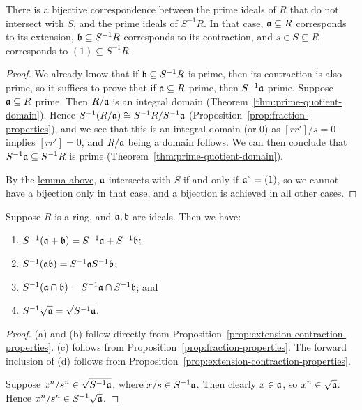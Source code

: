 \begin{theorem}\label{thm:fraction-correspondence}
    There is a bijective correspondence between 
    the prime ideals of \(R\) that do not intersect with \(S\),
    and the prime ideals of \(S^{-1}R\).
    In that case, \(\mathfrak{a} \subseteq R\) corresponds to its extension,
    \(\mathfrak{b} \subseteq S^{-1}R\) corresponds to its contraction,
    and \(s \in S \subseteq R\) corresponds to \((1) \subseteq S^{-1}R\).
\end{theorem}
\begin{proof}
    We already know that if \(\mathfrak{b} \subseteq S^{-1}R\) is prime,
    then its contraction is also prime,
    so it suffices to prove that if \(\mathfrak{a} \subseteq R\) prime, then \(S^{-1}\mathfrak{a}\) prime.
    Suppose \(\mathfrak{a} \subseteq R\) prime.
    Then \(R/\mathfrak{a}\) is an integral domain (Theorem~\ref{thm:prime-quotient-domain}).
    Hence \(S^{-1}(R/\mathfrak{a}) \cong S^{-1}R/S^{-1}\mathfrak{a}\) (Proposition~\ref{prop:fraction-properties}),
    and we see that this is an integral domain (or 0)
    as \([rr']/s = 0\) implies \([rr'] = 0\),
    and \(R/\mathfrak{a}\) being a domain follows.
    We can then conclude that \(S^{-1}\mathfrak{a} \subseteq S^{-1}R\) is prime
    (Theorem~\ref{thm:prime-quotient-domain}).

    By the \hyperref[lem:fraction-contractions]{lemma above},
    \(\mathfrak{a}\) intersects with \(S\) if and only if \(\mathfrak{a}^e = (1)\),
    so we cannot have a bijection only in that case,
    and a bijection is achieved in all other cases.
\end{proof}

\begin{proposition}\label{prop:fraction-ring-properties}
    Suppose \(R\) is a ring, and \(\mathfrak{a},\mathfrak{b}\) are ideals.
    Then we have:
    \begin{enumerate}[label={(\alph*)}, itemsep=0mm]
        \item \(S^{-1}(\mathfrak{a}+\mathfrak{b}) = S^{-1}\mathfrak{a} + S^{-1}\mathfrak{b}\);
        \item \(S^{-1}(\mathfrak{ab}) = S^{-1}\mathfrak{a} S^{-1}\mathfrak{b}\);
        \item \(S^{-1}(\mathfrak{a}\cap\mathfrak{b}) = S^{-1}\mathfrak{a} \cap S^{-1}\mathfrak{b}\); and
        \item \(S^{-1}\sqrt{\mathfrak{a}} = \sqrt{S^{-1}\mathfrak{a}}\).
    \end{enumerate}
\end{proposition}
\begin{proof}
    (a) and (b) follow directly from Proposition~\ref{prop:extension-contraction-properties}.
    (c) follows from Proposition~\ref{prop:fraction-properties}.
    The forward inclusion of (d) follows from Proposition~\ref{prop:extension-contraction-properties}.

    Suppose \(x^n/s^n \in \sqrt{S^{-1}\mathfrak{a}}\), where \(x/s \in S^{-1}\mathfrak{a}\).
    Then clearly \(x \in \mathfrak{a}\), so \(x^n \in \sqrt{\mathfrak{a}}\).
    Hence \(x^n/s^n \in S^{-1}\sqrt{\mathfrak{a}}\).
\end{proof}


